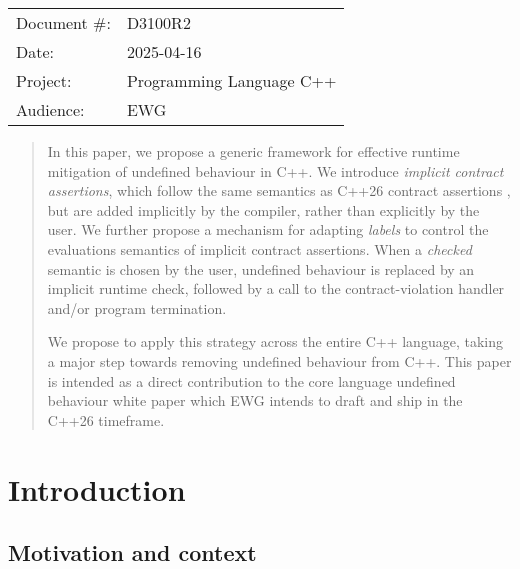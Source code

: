 \begin{tabular}{ll}
Document \#: & D3100R2 \\
Date: &2025-04-16 \\
Project: & Programming Language C++ \\
Audience: & EWG
\end{tabular}

\begin{abstract}
In this paper, we propose a generic framework for effective runtime mitigation of undefined behaviour in C++. We introduce \emph{implicit contract assertions}, which follow the same semantics as C++26 contract assertions \cite{P2900R14}, but are added implicitly by the compiler, rather than explicitly by the user. We further propose a mechanism for adapting \emph{labels} \cite{P3400R1} to control the evaluations semantics of implicit contract assertions. When a \emph{checked} semantic is chosen by the user, undefined behaviour is replaced by an implicit runtime check, followed by a call to the contract-violation handler and/or program termination.

We propose to apply this strategy across the entire C++ language, taking a major step towards removing undefined behaviour from C++. This paper is intended as a direct contribution to the core language undefined behaviour white paper \cite{P3656R0} which EWG intends to draft and ship in the C++26 timeframe.
\end{abstract}


\tableofcontents*
\pagebreak





\section{Introduction}
\label{intro}

\subsection{Motivation and context}

